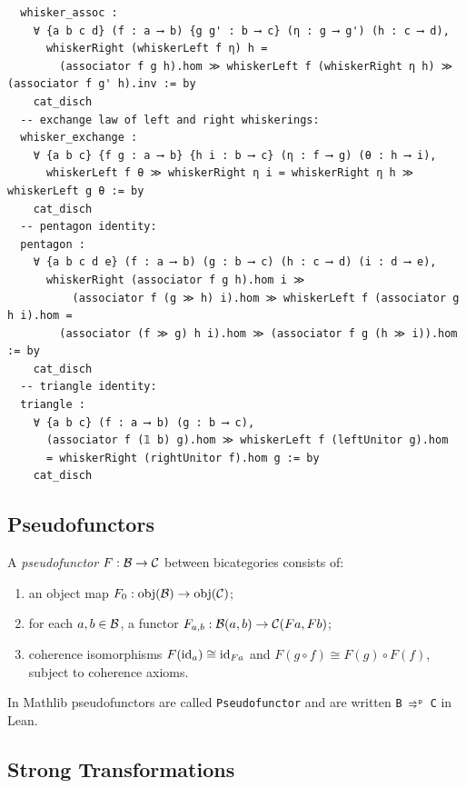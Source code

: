 \documentclass[12pt]{article}
\begin{document}
\begin{lstlisting}
  whisker_assoc :
    ∀ {a b c d} (f : a ⟶ b) {g g' : b ⟶ c} (η : g ⟶ g') (h : c ⟶ d),
      whiskerRight (whiskerLeft f η) h =
        (associator f g h).hom ≫ whiskerLeft f (whiskerRight η h) ≫ (associator f g' h).inv := by
    cat_disch
  -- exchange law of left and right whiskerings:
  whisker_exchange :
    ∀ {a b c} {f g : a ⟶ b} {h i : b ⟶ c} (η : f ⟶ g) (θ : h ⟶ i),
      whiskerLeft f θ ≫ whiskerRight η i = whiskerRight η h ≫ whiskerLeft g θ := by
    cat_disch
  -- pentagon identity:
  pentagon :
    ∀ {a b c d e} (f : a ⟶ b) (g : b ⟶ c) (h : c ⟶ d) (i : d ⟶ e),
      whiskerRight (associator f g h).hom i ≫
          (associator f (g ≫ h) i).hom ≫ whiskerLeft f (associator g h i).hom =
        (associator (f ≫ g) h i).hom ≫ (associator f g (h ≫ i)).hom := by
    cat_disch
  -- triangle identity:
  triangle :
    ∀ {a b c} (f : a ⟶ b) (g : b ⟶ c),
      (associator f (𝟙 b) g).hom ≫ whiskerLeft f (leftUnitor g).hom
      = whiskerRight (rightUnitor f).hom g := by
    cat_disch
\end{lstlisting}

\subsection{Pseudofunctors}

\begin{definition}
  A \emph{pseudofunctor} $F : \mathcal{B} \to \mathcal{C}$ between bicategories consists of:
  \begin{enumerate}[label=(\roman*)]
    \item an object map $F_0 : \mathrm{obj}(\mathcal{B}) \to \mathrm{obj}(\mathcal{C})$;
    \item for each $a,b \in \mathcal{B}$, a functor $F_{a,b} : \mathcal{B}(a,b) \to \mathcal{C}(Fa, Fb)$;
    \item coherence isomorphisms $F(\mathrm{id}_a) \cong \mathrm{id}_{Fa}$ and
          $F(g \circ f) \cong F(g) \circ F(f)$, subject to coherence axioms.
  \end{enumerate}
\end{definition}

In Mathlib pseudofunctors are called \lstinline{Pseudofunctor} and are written
\lstinline{B ⥤ᵖ C} in Lean.

\subsection{Strong Transformations}
\end{document}
